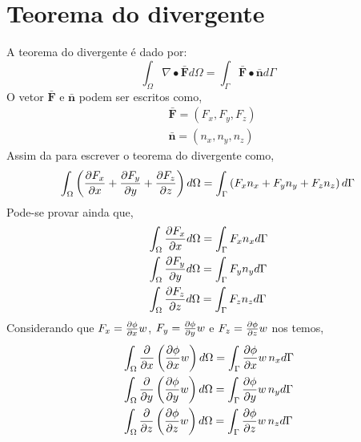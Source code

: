 \section{Teorema do divergente}

A teorema do divergente é dado por:
%
\begin{equation}
	\int_{\Omega} \nabla \bullet \pmb{\bar F} d \Omega = \int_{\Gamma} \pmb{\bar F} \bullet \pmb{\bar n} d \Gamma
\end{equation} 
%
O vetor $\pmb{\bar F}$ e  $\pmb{\bar n}$ podem ser escritos como,
%
\begin{equation}
	\begin{split}
	&\pmb{\bar F} = \left(F_x, F_y, F_z\right)\\
	&\pmb{\bar n} = \left(n_x, n_y, n_z\right)
	\end{split}
\end{equation} 
%
Assim da para escrever o teorema do divergente como,
%
\begin{equation}
\int_{\Omega} \left(\frac{\partial F_x}{\partial x} + \frac{\partial F_y}{\partial y} + \frac{\partial F_z}{\partial z}\right) d \Omega = \int_{\Gamma} \left(F_x n_x + F_y n_y + F_z n_z\right) d \Gamma
\end{equation}
%
Pode-se provar ainda que,
%
\begin{equation}
	\begin{split}
		&\int_{\Omega} \frac{\partial F_x}{\partial x} d \Omega = \int_{\Gamma} F_x n_x d \Gamma\\
		&\int_{\Omega} \frac{\partial F_y}{\partial y} d \Omega = \int_{\Gamma} F_y n_y d \Gamma\\
		&\int_{\Omega} \frac{\partial F_z}{\partial z} d \Omega = \int_{\Gamma} F_z n_z d \Gamma
	\end{split}
\end{equation} 
%
Considerando que $F_x = \frac{\partial \phi}{\partial x} w$, $F_y = \frac{\partial \phi}{\partial y} w$ e $F_z = \frac{\partial \phi}{\partial z} w$ nos temos,
%
\begin{equation}
	\begin{split}
		&\int_{\Omega} \frac{\partial }{\partial x}\left(\frac{\partial \phi}{\partial x} w\right) d \Omega = \int_{\Gamma} \frac{\partial \phi}{\partial x} w \, n_x d \Gamma\\
		&\int_{\Omega} \frac{\partial }{\partial y}\left(\frac{\partial \phi}{\partial y} w\right) d \Omega = \int_{\Gamma} \frac{\partial \phi}{\partial y} w \,n_y d \Gamma\\
		&\int_{\Omega} \frac{\partial }{\partial z}\left(\frac{\partial \phi}{\partial z} w\right) d \Omega = \int_{\Gamma} \frac{\partial \phi}{\partial z} w \,n_z d \Gamma
	\end{split}
\end{equation} 
